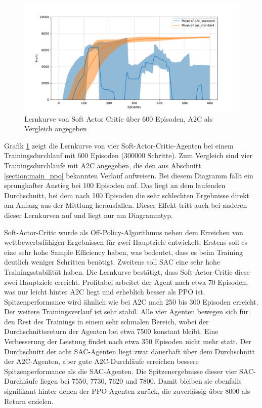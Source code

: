 \begin{figure}[htbp]
	\centering
	\includegraphics[width=\textwidth]{main/a2c_vs_sac.pdf}
	\caption{Lernkurve von Soft Actor Critic über 600 Episoden, A2C als Vergleich angegeben}
	\label{graphic:SACLearningCurve}
\end{figure}

Grafik \ref{graphic:SACLearningCurve} zeigt die Lernkurve von vier Soft-Actor-Critic-Agenten bei einem Trainingsdurchlauf mit 600 Episoden (300000 Schritte).
Zum Vergleich sind vier Trainingsdurchläufe mit A2C angegeben, die den aus Abschnitt \ref{section:main_ppo} bekannten Verlauf aufweisen.
Bei diesem Diagramm fällt ein sprunghafter Anstieg bei 100 Episoden auf.
Das liegt an dem laufenden Durchschnitt, bei dem nach 100 Episoden die sehr schlechten Ergebnisse direkt am Anfang aus der Mittlung herausfallen.
Dieser Effekt tritt auch bei anderen dieser Lernkurven auf und liegt nur am Diagrammtyp.

Soft-Actor-Critic wurde als Off-Policy-Algorithmus neben dem Erreichen von wettbewerbsfähigen Ergebnissen für zwei Hauptziele entwickelt:
Erstens soll es eine sehr hohe Sample Efficiency haben, was bedeutet, dass es beim Training deutlich weniger Schritten benötigt.
Zweitens soll SAC eine sehr hohe Trainingsstabilität haben.
Die Lernkurve bestätigt, dass Soft-Actor-Critic diese zwei Hauptziele erreicht.
Profitabel arbeitet der Agent nach etwa 70 Episoden, was nur leicht hinter A2C liegt und erheblich besser als PPO ist.
Spitzenperformance wird ähnlich wie bei A2C nach 250 bis 300 Episoden erreicht.
Der weitere Trainingsverlauf ist sehr stabil.
Alle vier Agenten bewegen sich für den Rest des Trainings in einem sehr schmalen Bereich, wobei der Durchschnittsreturn der Agenten bei etwa 7500 konstant bleibt.
Eine Verbesserung der Leistung findet nach etwa 350 Episoden nicht mehr statt.
Der Durchschnitt der acht SAC-Agenten liegt zwar dauerhaft über dem Durchschnitt der A2C-Agenten, aber gute A2C-Durchläufe erreichen bessere Spitzenperformance als die SAC-Agenten.
Die Spitzenergebnisse dieser vier SAC-Durchläufe liegen bei 7550, 7730, 7620 und 7800.
Damit bleiben sie ebenfalls signifikant hinter denen der PPO-Agenten zurück, die zuverlässig über 8000 als Return erzielen.

